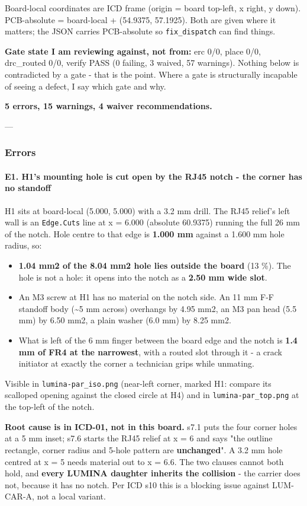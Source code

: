 \documentclass[11pt,a4paper]{article}
\begin{document}
Board-local coordinates are ICD frame (origin = board top-left, x right, y down). PCB-absolute = board-local + (54.9375, 57.1925). Both are given where it matters; the JSON carries PCB-absolute so \texttt{fix\_dispatch} can find things.

\textbf{Gate state I am reviewing against, not from:} erc 0/0, place 0/0, drc\_routed 0/0, verify PASS (0 failing, 3 waived, 57 warnings). Nothing below is contradicted by a gate - that is the point. Where a gate is structurally incapable of seeing a defect, I say which gate and why.

\textbf{5 errors, 15 warnings, 4 waiver recommendations.}

---

\subsubsection*{Errors}
\paragraph*{E1. H1's mounting hole is cut open by the RJ45 notch - the corner has no standoff}
H1 sits at board-local (5.000, 5.000) with a 3.2 mm drill. The RJ45 relief's left wall is an \texttt{Edge.Cuts} line at x = 6.000 (absolute 60.9375) running the full 26 mm of the notch. Hole centre to that edge is \textbf{1.000 mm} against a 1.600 mm hole radius, so:

\begin{itemize}
\item \textbf{1.04 mm2 of the 8.04 mm2 hole lies outside the board} (13 \%). The hole is
not a hole: it opens into the notch as a \textbf{2.50 mm wide slot}.
\item An M3 screw at H1 has no material on the notch side. An 11 mm F-F standoff
body (\textasciitilde{}5 mm across) overhangs by 4.95 mm2, an M3 pan head (5.5 mm) by
6.50 mm2, a plain washer (6.0 mm) by 8.25 mm2.
\item What is left of the 6 mm finger between the board edge and the notch is
\textbf{1.4 mm of FR4 at the narrowest}, with a routed slot through it - a crack
initiator at exactly the corner a technician grips while unmating.
\end{itemize}
Visible in \texttt{lumina-par\_iso.png} (near-left corner, marked H1: compare its scalloped opening against the closed circle at H4) and in \texttt{lumina-par\_top.png} at the top-left of the notch.

\textbf{Root cause is in ICD-01, not in this board.} s7.1 puts the four corner holes at a 5 mm inset; s7.6 starts the RJ45 relief at x = 6 and says "the outline rectangle, corner radius and 5-hole pattern are \textbf{unchanged}". A 3.2 mm hole centred at x = 5 needs material out to x = 6.6. The two clauses cannot both hold, and \textbf{every LUMINA daughter inherits the collision} - the carrier does not, because it has no notch. Per ICD s10 this is a blocking issue against LUM-CAR-A, not a local variant.
\end{document}
